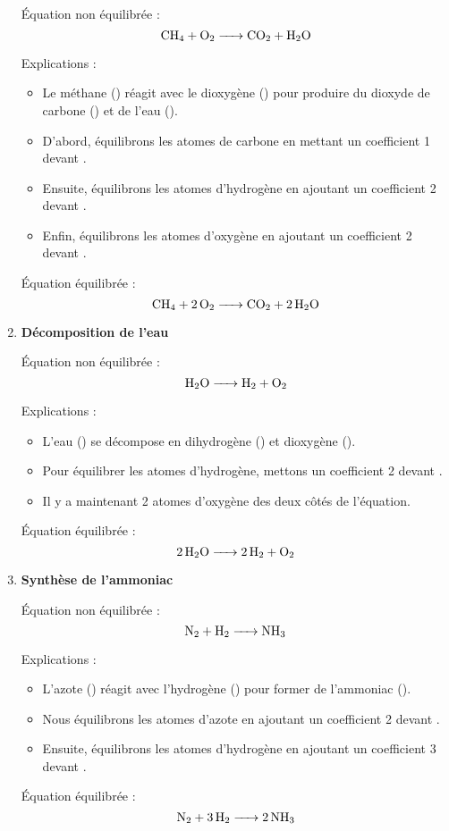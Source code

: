 \documentclass[a4paper,12pt]{article}
\begin{document}
\begin{enumerate}
  Équation non équilibrée :
  \[
  \ce{CH4 + O2 -> CO2 + H2O}
  \]

  Explications :
  \begin{itemize}
      \item Le méthane () réagit avec le dioxygène () pour produire du dioxyde de carbone () et de l'eau ().
      \item D'abord, équilibrons les atomes de carbone en mettant un coefficient 1 devant .
      \item Ensuite, équilibrons les atomes d'hydrogène en ajoutant un coefficient 2 devant .
      \item Enfin, équilibrons les atomes d'oxygène en ajoutant un coefficient 2 devant .
  \end{itemize}
  Équation équilibrée :
  \[
  \ce{CH4 + 2 O2 -> CO2 + 2 H2O}
  \]

  \item \textbf{Décomposition de l'eau}

  Équation non équilibrée :
  \[
  \ce{H2O -> H2 + O2}
  \]

  Explications :
  \begin{itemize}
      \item L'eau () se décompose en dihydrogène () et dioxygène ().
      \item Pour équilibrer les atomes d'hydrogène, mettons un coefficient 2 devant .
      \item Il y a maintenant 2 atomes d'oxygène des deux côtés de l'équation.
  \end{itemize}
  Équation équilibrée :
  \[
  \ce{2 H2O -> 2 H2 + O2}
  \]

  \item \textbf{Synthèse de l'ammoniac}

  Équation non équilibrée :
  \[
  \ce{N2 + H2 -> NH3}
  \]

  Explications :
  \begin{itemize}
      \item L'azote () réagit avec l'hydrogène () pour former de l'ammoniac ().
      \item Nous équilibrons les atomes d'azote en ajoutant un coefficient 2 devant .
      \item Ensuite, équilibrons les atomes d'hydrogène en ajoutant un coefficient 3 devant .
  \end{itemize}
  Équation équilibrée :
  \[
  \ce{N2 + 3 H2 -> 2 NH3}
  \]


\end{enumerate}
\end{document}
